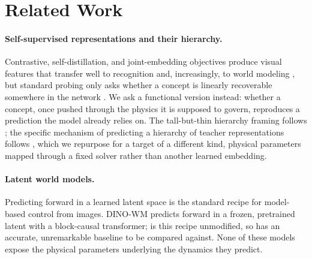 \section{Related Work}
\label{sec:related-work}

\paragraph{Self-supervised representations and their hierarchy.}
Contrastive, self-distillation, and joint-embedding objectives
\citep{caron2021dino,oquab2023dinov2,assran2023ijepa,he2022mae} produce
visual features that transfer well to recognition and, increasingly, to
world modeling \citep{zhou2024dinowm}, but standard probing only asks
whether a concept is linearly recoverable somewhere in the network
\citep{alain2016probes}. We ask a functional version instead: whether a
concept, once pushed through the physics it is supposed to govern,
reproduces a prediction the model already relies on. The tall-but-thin
hierarchy framing follows \citet{filling-hierarchy-blog}; the specific
mechanism of predicting a hierarchy of teacher representations follows
\citet{constructive-ssl-blog}, which we repurpose for a target of a
different kind, physical parameters mapped through a fixed solver
rather than another learned embedding.

\paragraph{Latent world models.}
Predicting forward in a learned latent space
\citep{ha2018worldmodels,hafner2019planet,hafner2020dreamer,
hafner2023dreamerv3} is the standard recipe for model-based control
from images. DINO-WM \citep{zhou2024dinowm} predicts forward in a
frozen, pretrained latent with a block-causal transformer; \pathA is
this recipe unmodified, so \pathB has an accurate, unremarkable
baseline to be compared against. None of these models expose the
physical parameters underlying the dynamics they predict.

